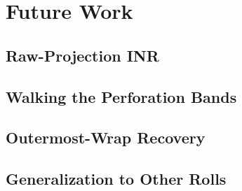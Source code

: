 \chapter{Future Work}
\label{chap:future-work}

\section{Raw-Projection INR}
\label{sec:future-rawprojection}

\section{Walking the Perforation Bands}
\label{sec:future-perfwalk}

\section{Outermost-Wrap Recovery}
\label{sec:future-outerwrap}

\section{Generalization to Other Rolls}
\label{sec:future-generalization}
